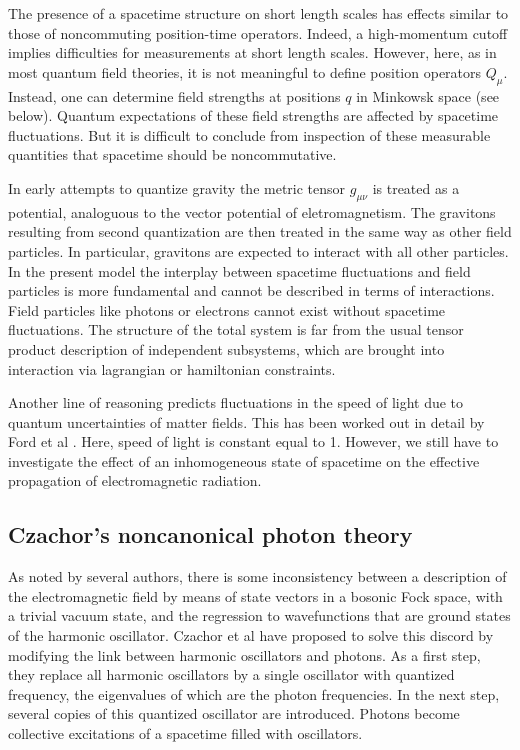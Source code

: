 \documentclass[12pt,a4paper]{article}
\begin{document}
The presence of a spacetime structure on
short length scales has effects similar to those
of noncommuting position-time operators.
Indeed, a high-momentum cutoff implies difficulties
for measurements at short length scales.
However, here, as in most quantum field theories,
it is not meaningful to define
position operators $Q_\mu$.
Instead, one can determine field strengths
at positions $q$ in Minkowsk space (see below).
Quantum expectations of these field strengths
are affected by spacetime fluctuations.
But it is difficult to conclude from inspection of these
measurable quantities that spacetime should be
noncommutative.

In early attempts to quantize gravity the metric
tensor $g_{\mu\nu}$ is treated as a potential,
analoguous to the vector potential of eletromagnetism.
The gravitons resulting from second quantization
are then treated in the same way as other field particles.
In particular, gravitons are expected to interact with all other
particles. In the present model the interplay between
spacetime fluctuations and field particles is more fundamental
and cannot be described in terms of interactions.
Field particles like photons or electrons cannot
exist without spacetime fluctuations. The structure
of the total system is far from the usual tensor product
description of independent subsystems, which are brought
into interaction via lagrangian or hamiltonian constraints.

Another line of reasoning predicts fluctuations in the speed
of light due to quantum uncertainties of matter fields.
This has been worked out in detail by Ford et al
\cite {FLH94,FS96}. Here, speed of light is constant equal to 1.
However, we still have to investigate the effect of an inhomogeneous state
of spacetime on the effective propagation of electromagnetic radiation.



\subsection {Czachor's noncanonical photon theory}


As noted by 
several authors, there is some inconsistency between a 
description of the electromagnetic field by means of state 
vectors in a bosonic Fock space, with a trivial vacuum state, and 
the regression to wavefunctions that are ground states of the 
harmonic oscillator. Czachor et al \cite {CM00,CS01,CM02} have proposed to solve 
this discord by modifying the link between harmonic oscillators 
and photons. As a first step, they replace all harmonic 
oscillators by a single oscillator with quantized frequency, the 
eigenvalues of which are the photon frequencies. In the next 
step, several copies of this quantized oscillator are introduced.
Photons become collective excitations of a spacetime filled 
with oscillators.
\end{document}
